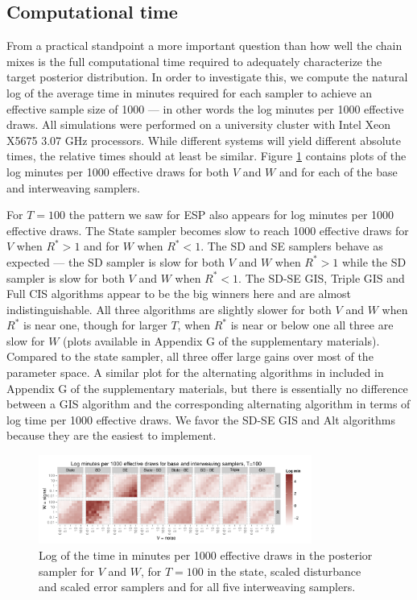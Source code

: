 \documentclass[12pt]{article}
\begin{document}
\subsection{Computational time}\label{sec:LLM:time}

From a practical standpoint a more important question than how well the chain mixes is the full computational time required to adequately characterize the target posterior distribution. In order to investigate this, we compute the natural log of the average time in minutes required for each sampler to achieve an effective sample size of 1000 --- in other words the log minutes per 1000 effective draws. All simulations were performed on a university cluster with Intel Xeon X5675 3.07 GHz processors. While different systems will yield different absolute times, the relative times should at least be similar. Figure \ref{baseinttimeplot} contains plots of the log minutes per 1000 effective draws for both $V$ and $W$ and for each of the base and interweaving samplers.

For $T=100$ the pattern we saw for ESP also appears for log minutes per 1000 effective draws. The State sampler becomes slow to reach 1000 effective draws for $V$ when $R^*>1$ and for $W$ when $R^*<1$. The SD and SE samplers behave as expected --- the SD sampler is slow for both $V$ and $W$ when $R^*>1$ while the SD sampler is slow for both $V$ and $W$ when $R^*<1$. The SD-SE GIS, Triple GIS and Full CIS algorithms appear to be the big winners here and are almost indistinguishable. All three algorithms are slightly slower for both $V$ and $W$ when $R^*$ is near one, though for larger $T$,  when $R^*$ is near or below one all three are slow for $W$ (plots available in Appendix G of the supplementary materials). Compared to the state sampler, all three offer large gains over most of the parameter space. A similar plot for the alternating algorithms in included in Appendix G of the supplementary materials, but there is essentially no difference between a GIS algorithm and the corresponding alternating algorithm in terms of log time per 1000 effective draws. We favor the SD-SE GIS and Alt algorithms because they are the easiest to implement.

\begin{figure}[!h]
\centering
\includegraphics[width=0.8\textwidth]{baseinttimeplot100}
\caption{Log of the time in minutes per 1000 effective draws in the posterior sampler for $V$ and $W$, for $T=100$ in the state, scaled disturbance and scaled error samplers and for all five interweaving samplers.}
\label{baseinttimeplot}
\end{figure}
\end{document}
